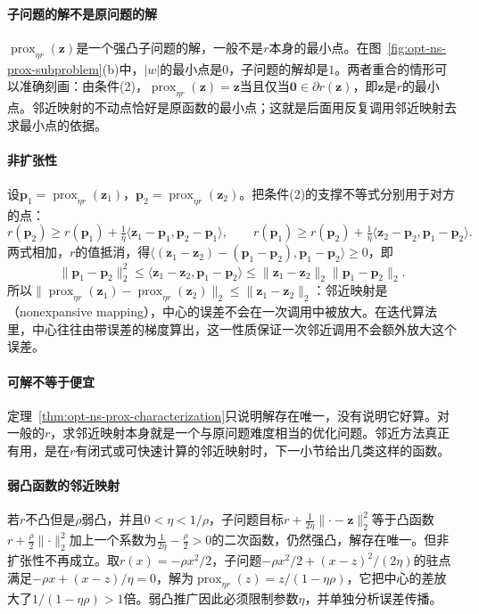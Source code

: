 \paragraph{子问题的解不是原问题的解}
$\operatorname{prox}_{\eta r}(\bm z)$是一个强凸子问题的解，一般不是$r$本身的最小点。在图~\ref{fig:opt-ns-prox-subproblem}(b)中，$|w|$的最小点是$0$，子问题的解却是$1$。两者重合的情形可以准确刻画：由条件(2)，$\operatorname{prox}_{\eta r}(\bm z)=\bm z$当且仅当$\bm 0\in\partial r(\bm z)$，即$\bm z$是$r$的最小点。邻近映射的不动点恰好是原函数的最小点；这就是后面用反复调用邻近映射去求最小点的依据。

\paragraph{非扩张性}
设$\bm p_1=\operatorname{prox}_{\eta r}(\bm z_1)$，$\bm p_2=\operatorname{prox}_{\eta r}(\bm z_2)$。把条件(2)的支撑不等式分别用于对方的点：
\[
 r(\bm p_2)\geq r(\bm p_1)+\tfrac1\eta\langle\bm z_1-\bm p_1,\bm p_2-\bm p_1\rangle,\qquad
 r(\bm p_1)\geq r(\bm p_2)+\tfrac1\eta\langle\bm z_2-\bm p_2,\bm p_1-\bm p_2\rangle.
\]
两式相加，$r$的值抵消，得$\langle(\bm z_1-\bm z_2)-(\bm p_1-\bm p_2),\bm p_1-\bm p_2\rangle\geq0$，即
\begin{equation}
 \lVert\bm p_1-\bm p_2\rVert_2^2\leq\langle\bm z_1-\bm z_2,\bm p_1-\bm p_2\rangle\leq\lVert\bm z_1-\bm z_2\rVert_2\lVert\bm p_1-\bm p_2\rVert_2 .
 \label{eq:opt-ns-prox-firm}
\end{equation}
所以$\lVert\operatorname{prox}_{\eta r}(\bm z_1)-\operatorname{prox}_{\eta r}(\bm z_2)\rVert_2\leq\lVert\bm z_1-\bm z_2\rVert_2$：邻近映射是（nonexpansive mapping），中心的误差不会在一次调用中被放大。在迭代算法里，中心往往由带误差的梯度算出，这一性质保证一次邻近调用不会额外放大这个误差。

\paragraph{可解不等于便宜}
定理~\ref{thm:opt-ns-prox-characterization}只说明解存在唯一，没有说明它好算。对一般的$r$，求邻近映射本身就是一个与原问题难度相当的优化问题。邻近方法真正有用，是在$r$有闭式或可快速计算的邻近映射时，下一小节给出几类这样的函数。

\paragraph{弱凸函数的邻近映射}
若$r$不凸但是$\rho$弱凸，并且$0<\eta<1/\rho$，子问题目标$r+\frac1{2\eta}\lVert\cdot-\bm z\rVert_2^2$等于凸函数$r+\frac\rho2\lVert\cdot\rVert_2^2$加上一个系数为$\frac1{2\eta}-\frac\rho2>0$的二次函数，仍然强凸，解存在唯一。但非扩张性不再成立。取$r(x)=-\rho x^2/2$，子问题$-\rho x^2/2+(x-z)^2/(2\eta)$的驻点满足$-\rho x+(x-z)/\eta=0$，解为$\operatorname{prox}_{\eta r}(z)=z/(1-\eta\rho)$，它把中心的差放大了$1/(1-\eta\rho)>1$倍。弱凸推广因此必须限制参数$\eta$，并单独分析误差传播。

